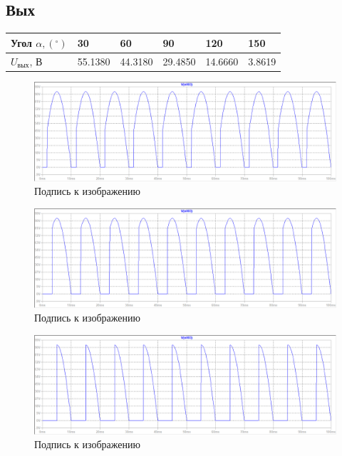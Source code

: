 \documentclass[a4paper, 12pt]{article}
\begin{document}
    \subsection{Вых}
    \begin{center}
    \begin{tabular}{ | m{5em} | m{1.5cm}| m{1.5cm} | m{1.5cm} | m{1.5cm} | m{1.5cm} | } 
    \hline
    Угол $\alpha,\left(^\circ\right)$& 30 & 60 & 90 &120 &150 \\ 
    \hline
    $U_{\text{вых}}$, В& 55.1380 & 44.3180 & 29.4850 &14.6660 &3.8619\\ 
    \hline
    \end{tabular}
    \end{center}


    \begin{figure}[H]
        \centering
        \includegraphics[scale=0.45]{a30.png}
        \captionsetup{skip=0pt}
        \caption{Подпись к изображению}
        \label{fig:a30}
    \end{figure}
    \begin{figure}[H]
        \centering
        \includegraphics[scale=0.45]{a60.png}
        \captionsetup{skip=0pt}
        \caption{Подпись к изображению}
        \label{fig:a60}
    \end{figure}
    \begin{figure}[H]
        \centering
        \includegraphics[scale=0.45]{a90.png}
        \captionsetup{skip=0pt}
        \caption{Подпись к изображению}
        \label{fig:a90}
    \end{figure}
\end{document}
